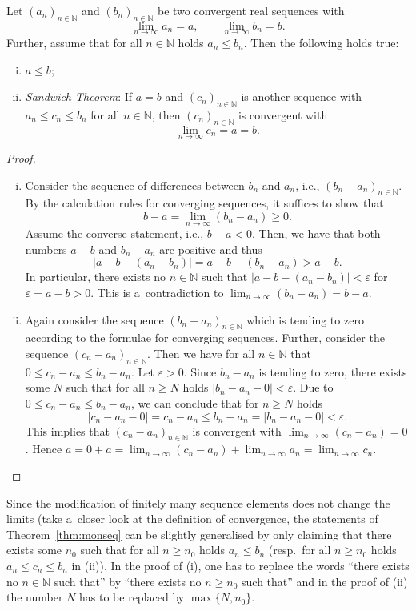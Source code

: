 
\begin{Theorem}\label{thm:monseq}
  Let $(a_n)_{n\in\mathbb{N}}$ and $(b_n)_{n\in\mathbb{N}}$ be two convergent real sequences with
\[\lim_{n\to\infty}a_n=a,\qquad \lim_{n\to\infty}b_n=b.\]
  Further, assume that for all $n\in\mathbb{N}$ holds $a_n\leq b_n$. Then the following holds true:
\begin{enumerate}[(i)]
 \item $a\leq b$;
 \item \emph{Sandwich-Theorem}: If $a=b$ and $(c_n)_{n\in\mathbb{N}}$ is another sequence with $a_n\leq c_n\leq b_n$ for all $n \in \mathbb{N}$, then $(c_n)_{n\in\mathbb{N}}$ is convergent with
\[\lim_{n\to\infty}c_n=a=b.\]
 
\end{enumerate}
\end{Theorem}
\begin{proof}
\begin{enumerate}[(i)]
\item 
  Consider the sequence of differences between $b_n$ and $a_n$, i.e., $(b_n-a_n)_{n\in\mathbb{N}}$. By the calculation rules for converging sequences, it suffices to show that
\[b-a=\lim_{n\to\infty}(b_n-a_n)\geq0.\]
Assume the converse statement, i.e., $b-a<0$. Then, we have that both numbers $a-b$ and $b_n-a_n$ are positive and thus
    \[|a-b-(a_n-b_n)|=a-b+(b_n-a_n)>a-b.\] In particular, there exists no $n\in\mathbb{N}$ such that $|a-b-(a_n-b_n)|<\varepsilon$ for $\varepsilon=a-b>0$. This is a~contradiction to $\lim_{n\to\infty}(b_n-a_n)=b-a$.
\item Again consider the sequence $(b_n-a_n)_{n\in\mathbb{N}}$ which is tending to zero according to the formulae for converging sequences. Further, consider the sequence $(c_n-a_n)_{n\in\mathbb{N}}$. 
Then we have
  for all $n\in\mathbb{N}$ that $0\leq c_n-a_n\leq b_n-a_n$.
Let $\varepsilon>0$. Since $b_n-a_n$ is tending to zero, there exists some $N$ such that for all $n\geq N$ holds $|b_n-a_n-0|<\varepsilon$. Due to $0\leq c_n-a_n\leq b_n-a_n$, we can conclude that for $n\geq N$ holds
\[|c_n-a_n-0|=c_n-a_n\leq b_n-a_n= |b_n-a_n-0|<\varepsilon.\]
    This implies that $(c_n-a_n)_{n\in\mathbb{N}}$ is convergent with $\lim_{n\to\infty}(c_n-a_n)=0$.
Hence $a=0+a=\lim_{n\rightarrow\infty} (c_n-a_n) + \lim_{n\rightarrow\infty} a_n = \lim_{n\rightarrow\infty} c_n $.
\end{enumerate}
\end{proof}

\begin{Remark}{}\label{rem:n_0mon}
  Since the modification of finitely many sequence elements does not change the limits (take a~closer look at the definition of convergence, the statements of Theorem~\ref{thm:monseq} can be slightly generalised by only claiming that there exists some $n_0$ such that for all $n\geq n_0$ holds $a_n\leq b_n$ (resp.\ for all $n\geq n_0$ holds $a_n\leq c_n\leq b_n$ in (ii)). In the proof of (i), one has to replace the words ``there exists no $n\in\mathbb{N}$ such that'' by ``there exists no $n\geq n_0$ such that'' and in the proof of (ii) the number $N$ has to be replaced by $\max\{N,n_0\}$.
\end{Remark}

